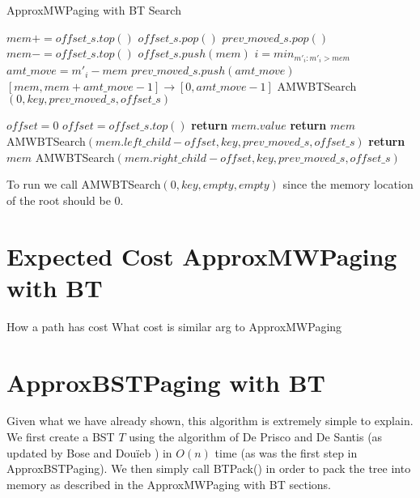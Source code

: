\documentclass[letterpaper,12pt,titlepage,oneside,final]{book}
\theoremstyle{plain}
\begin{document}
\begin{algorithm}[H]
\caption{ApproxMWPaging with BT Search}
\footnotesize
\label{AMWBTPack}
\begin{algorithmic}[1]
		\State $mem += offset\_s.top()$
		\State $offset\_s.pop()$
		\State $prev\_moved\_s.pop()$
			\State $mem -= offset\_s.top()$
		\EndIf
	\EndIf
	\State $offset\_s.push(mem)$
	\State $i = min_{m'_i : m'_i > mem}$
	\State $amt\_move = m'_i - mem$
	\State $prev\_moved\_s.push(amt\_move)$
	\State $[mem, mem + amt\_move - 1] \rightarrow [0, amt\_move - 1]$
	\State AMWBT\textendash Search$(0, key, prev\_moved\_s, offset\_s)$

\Else 
	\State $offset = 0$
		\State $offset = offset\_s.top()$
	\EndIf	
		\State \textbf{return} $mem.value$
			\State \textbf{return} $mem$
		\Else
			\State  AMWBT\textendash Search$(mem.left\_child - offset, key, prev\_moved\_s, offset\_s)$
		\EndIf
	\Else
			\State \textbf{return} $mem$
		\Else
			\State  AMWBT\textendash Search$(mem.right\_child - offset, key, prev\_moved\_s, offset\_s)$
		\EndIf
	\EndIf	
\EndIf
\EndProcedure
\end{algorithmic}
\end{algorithm}

To run we call AMWBT\textendash Search$(0, key, empty, empty)$ since the memory location of the root should be $0$.




\section{Expected Cost ApproxMWPaging with BT}

How a path has cost
What cost is
similar arg to ApproxMWPaging


\section{ApproxBSTPaging with BT}

Given what we have already shown, this algorithm is extremely simple to explain. We first create a BST $T$ using the algorithm of De Prisco and De Santis \cite{de1993binary} (as updated by Bose and Dou\"{i}eb \cite{bose2009efficient}) in $O(n)$ time (as was the first step in ApproxBSTPaging). We then simply call BT\textendash Pack() in order to pack the tree into memory as described in the ApproxMWPaging with BT sections.
\end{document}
